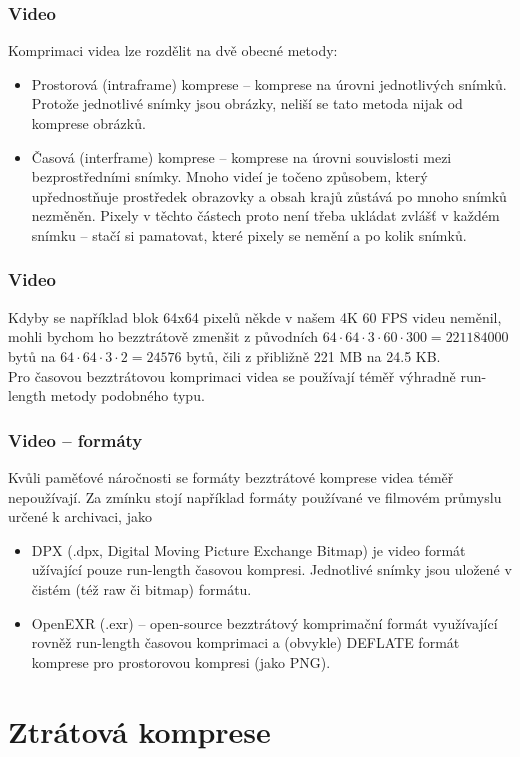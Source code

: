\documentclass[aspectratio=169,11pt,svgnames,handout]{beamer}
\begin{document}
\begin{frame}
 \frametitle{Video}
 Komprimaci videa lze rozdělit na dvě obecné metody:
 \begin{itemize}[label=\textbullet]
  \item \alert{Prostorová} (intraframe) komprese -- komprese na úrovni
   jednotlivých snímků. Protože jednotlivé snímky jsou obrázky, neliší se tato
   metoda nijak od komprese obrázků.
  \pause
 \item \alert{Časová} (interframe) komprese -- komprese na úrovni souvislosti
  mezi bezprostředními snímky. Mnoho videí je točeno způsobem, který
  upřednostňuje prostředek obrazovky a obsah krajů zůstává po mnoho snímků
  nezměněn. \pause
  Pixely v těchto částech proto není třeba ukládat zvlášť v každém snímku --
  stačí si pamatovat, které pixely se nemění a po kolik snímků.
 \end{itemize}
\end{frame}

\begin{frame}
 \frametitle{Video}
 Kdyby se například blok 64x64 pixelů někde v našem 4K 60 FPS videu neměnil,
 mohli bychom ho bezztrátově zmenšit z původních $64 \cdot 64 \cdot 3 \cdot 60
 \cdot 300 = 221184000$ bytů na $64 \cdot 64 \cdot 3 \cdot 2 = 24576$ bytů, čili
 z přibližně 221 MB na 24.5 KB.\pause\\
 Pro \alert{časovou} bezztrátovou komprimaci videa se používají téměř výhradně
 run-length metody podobného typu.
\end{frame}

\begin{frame}
 \frametitle{Video -- formáty}
 Kvůli paměťové náročnosti se formáty bezztrátové komprese videa téměř
 nepoužívají. \pause Za zmínku stojí například formáty používané ve filmovém
 průmyslu určené k archivaci, jako
 \begin{itemize}[label=\textbullet]
  \item \alert{DPX} (.dpx, Digital Moving Picture Exchange Bitmap) je video
   formát užívající pouze run-length časovou kompresi. Jednotlivé snímky jsou
   uložené v čistém (též raw či bitmap) formátu.
   \pause
  \item \alert{OpenEXR} (.exr) -- open-source bezztrátový komprimační formát
   využívající rovněž run-length časovou komprimaci a (obvykle) DEFLATE formát
   komprese pro prostorovou kompresi (jako PNG).
 \end{itemize}
\end{frame}

\section{Ztrátová komprese}
\label{sec:ztratova-komprese}
\end{document}
